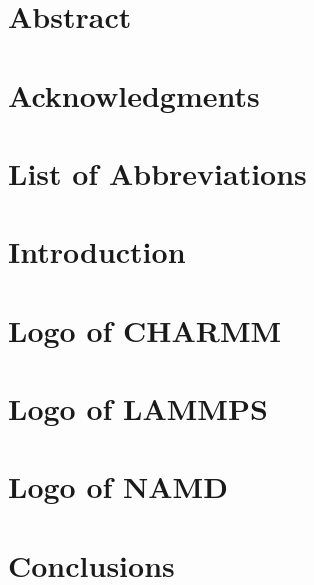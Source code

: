 \documentclass[12pt, twoside]{book}
\begin{document}

\newpage\null\thispagestyle{empty}\newpage

\chapter*{Abstract}


\chapter*{Acknowledgments}


\pagestyle{plain}
\tableofcontents
\listoffigures
\listoftables
{}
\chapter*{List of Abbreviations}



\chapter{Introduction}
\setlength{\parskip}{0em}


\chapter{Logo of CHARMM}


\chapter{Logo of LAMMPS}


\chapter{Logo of NAMD}


\chapter{Conclusions}


{}
 
\end{document}
